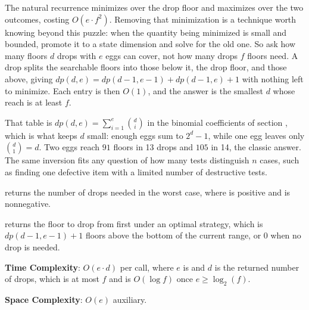 The natural recurrence minimizes over the drop floor and maximizes over the two outcomes, costing $O(e \cdot f^{2})$. Removing that minimization is a technique worth knowing beyond this puzzle: when the quantity being minimized is small and bounded, promote it to a state dimension and solve for the old one. So ask how many floors $d$ drops with $e$ eggs can cover, not how many drops $f$ floors need. A drop splits the searchable floors into those below it, the drop floor, and those above, giving $dp(d, e) = dp(d-1, e-1) + dp(d-1, e) + 1$ with nothing left to minimize. Each entry is then $O(1)$, and the answer is the smallest $d$ whose reach is at least $f$.

That table is $dp(d, e) = \sum_{i=1}^{e} \binom{d}{i}$ in the binomial coefficients of section , which is what keeps $d$ small: enough eggs sum to $2^d - 1$, while one egg leaves only $\binom{d}{1} = d$. Two eggs reach $91$ floors in 13 drops and $105$ in 14, the classic answer. The same inversion fits any question of how many tests distinguish $n$ cases, such as finding one defective item with a limited number of destructive tests.

\begin{compactitem}
  \item {} returns the number of drops needed in the worst case, where  is positive and  is nonnegative.
  \item {} returns the floor to drop from first under an optimal strategy, which is $dp(d-1, e-1) + 1$ floors above the bottom of the current range, or $0$ when no drop is needed.
\end{compactitem}

\textbf{Time Complexity}: $O(e \cdot d)$ per call, where $e$ is  and $d$ is the returned number of drops, which is at most $f$ and is $O(\log f)$ once $e \geq \log_2(f)$.

\textbf{Space Complexity}: $O(e)$ auxiliary.

